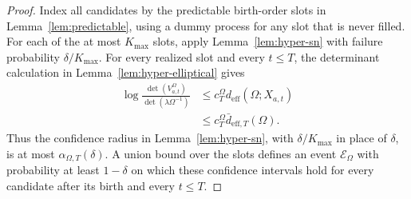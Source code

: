 \documentclass{article} %
\begin{document}
\begin{proof}
Index all candidates by the predictable birth-order slots in
Lemma~\ref{lem:predictable}, using a dummy process for any slot that is never
filled. For each of the at most \(K_{\max}\) slots, apply
Lemma~\ref{lem:hyper-sn} with failure probability
\(\delta/K_{\max}\). For every realized slot and every \(t\le T\), the
determinant calculation in Lemma~\ref{lem:hyper-elliptical} gives
\begin{align}
\label{eq:hyper-deff-proof-det-cap}
\log
\frac{\det(V_{a,t}^{\Omega})}
{\det(\lambda\Omega^{-1})}
&\le
c_T^\Omega d_{\mathrm{eff}}(\Omega;X_{a,t})
\\
&\le
c_T^\Omega\bar d_{\mathrm{eff},T}(\Omega).
\end{align}
Thus the confidence radius in Lemma~\ref{lem:hyper-sn}, with
\(\delta/K_{\max}\) in place of \(\delta\), is at most
\(\alpha_{\Omega,T}(\delta)\). A union bound over the slots defines an event
\(\mathcal E_\Omega\) with probability at least \(1-\delta\) on which these
confidence intervals hold for every candidate after its birth and every
\(t\le T\).


\end{proof}
\end{document}
